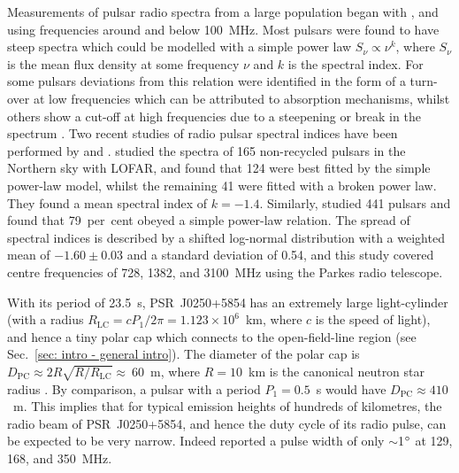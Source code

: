 Measurements of pulsar radio spectra from a large population began with \citet{Sxxx1973}, \citet{MMxx1980} and \citet{IKMS1981} using frequencies around and below 100~MHz. Most pulsars were found to have steep spectra which could be modelled with a simple power law $S_\nu \propto \nu^k$, where $S_\nu$ is the mean flux density at some frequency $\nu$ and $k$ is the spectral index. For some pulsars deviations from this relation were identified in the form of a turn-over at low frequencies which can be attributed to absorption mechanisms, whilst others show a cut-off at high frequencies due to a steepening or break in the spectrum \citep{Sxxx1973}. Two recent studies of radio pulsar spectral indices have been performed by \citet{BKK+2016} and \citet{JSK+2018}. \citet{BKK+2016} studied the spectra of 165 non-recycled pulsars in the Northern sky with LOFAR, and found that 124 were best fitted by the simple power-law model, whilst the remaining 41 were fitted with a broken power law. They found a mean spectral index of $k = -1.4$. Similarly, \citet{JSK+2018} studied 441 pulsars and found that 79~per~cent obeyed a simple power-law relation. The spread of spectral indices is described by a shifted log-normal distribution with a weighted mean of $-1.60\pm0.03$ and a standard deviation of 0.54, and this study covered centre frequencies of 728, 1382, and 3100~MHz using the Parkes radio telescope.

With its period of 23.5~s, PSR~J0250+5854 has an extremely large light-cylinder (with a radius $R_\mathrm{LC} = cP_1/2\pi =  1.123\times10^{6}$~km, where $c$ is the speed of light), and hence a tiny polar cap which connects to the open-field-line region (see Sec.~\ref{sec: intro - general intro}). The diameter of the polar cap is $D_\mathrm{PC} \approx 2R\sqrt{R/R_\mathrm{LC}} \approx~60$~m, where $R = 10$~km is the canonical neutron star radius \citep[e.g.][]{Sxxx1971}. By comparison, a pulsar with a period $P_1 = 0.5$~s would have $D_\mathrm{PC} \approx 410$~m. This implies that for typical emission heights of hundreds of kilometres, the radio beam of PSR~J0250+5854, and hence the duty cycle of its radio pulse, can be expected to be very narrow. Indeed \citet{TBC+2018} reported a pulse width of only $\sim$1$^\circ$ at 129, 168, and 350~MHz. 


